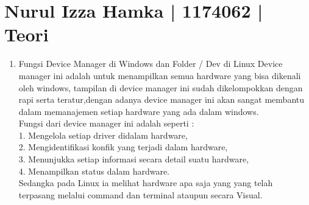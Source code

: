 \section{Nurul Izza Hamka | 1174062 | Teori}
\begin{enumerate}

\item Fungsi Device Manager di Windows dan Folder / Dev di Linux 
Device manager ini adalah untuk menampilkan semua hardware yang bisa dikenali oleh windows, tampilan di device manager ini sudah dikelompokkan dengan rapi serta teratur,dengan adanya device manager ini akan sangat membantu dalam memanajemen setiap hardware yang ada dalam windows. \\
Fungsi dari device manager ini adalah seperti :\\
1. Mengelola setiap driver didalam hardware,\\
2. Mengidentifikasi konfik yang terjadi dalam hardware,\\
3. Menunjukka setiap informasi secara detail suatu hardware,\\
4. Menampilkan status dalam hardware.\\
Sedangka pada Linux ia melihat hardware apa saja yang yang telah terpasang melalui command dan terminal ataupun secara Visual.


\end{enumerate}
